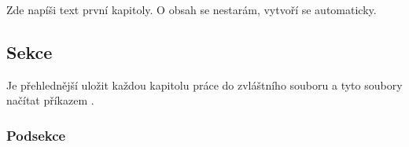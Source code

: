 Zde napíši text první kapitoly. O obsah se nestarám, vytvoří se automaticky.

\subsection{Sekce}
Je přehlednější uložit každou kapitolu práce do zvláštního souboru a tyto soubory načítat příkazem \verb--.
%

\subsubsection{Podsekce}
